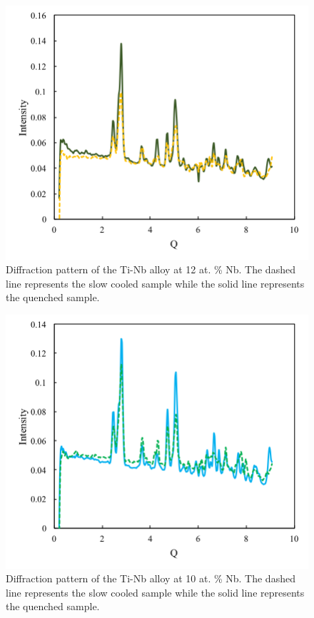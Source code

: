 \pagebreak
\begin{figure}[H]
	\centering
	\includegraphics[width=\textwidth]{Chapter-7/Figures/50diff12.png}
	\caption{Diffraction pattern of the Ti-Nb alloy at 12 at. \% Nb. The dashed line represents the slow cooled sample while the solid line represents the quenched sample.}
	\label{Ch7-figure:50diff12}
\end{figure}

\pagebreak
\begin{figure}[H]
	\centering
	\includegraphics[width=\textwidth]{Chapter-7/Figures/50diff10.png}
	\caption{Diffraction pattern of the Ti-Nb alloy at 10 at. \% Nb. The dashed line represents the slow cooled sample while the solid line represents the quenched sample.}
	\label{Ch7-figure:50diff10}
\end{figure}
